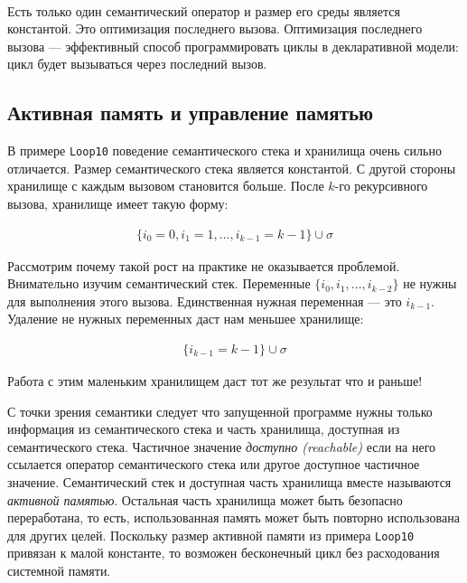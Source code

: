 \begin{eqnarray*}
  [(\text{\lstinline|$\{$Loop10 I+1$\}$|}, \{I \to i_{k-1}\})]
\end{eqnarray*}

Есть только один семантический оператор и размер его среды является константой. Это оптимизация последнего вызова. Оптимизация последнего вызова --- эффективный способ программировать циклы в декларативной модели: цикл будет вызываться через последний вызов.

\subsection{Активная память и управление памятью}

В примере \lstinline|Loop10| поведение семантического стека и хранилища очень сильно отличается. Размер семантического стека является константой. С другой стороны хранилище с каждым вызовом становится больше. После $k$-го рекурсивного вызова, хранилище имеет такую форму:

\begin{eqnarray*}
  \{i_0 = 0, i_1 = 1, ..., i_{k-1} = k - 1\} \cup \sigma
\end{eqnarray*}

Рассмотрим почему такой рост на практике не оказывается проблемой. Внимательно изучим семантический стек. Переменные $\{i_0, i_1, ..., i_{k-2}\}$  не нужны для выполнения этого вызова. Единственная нужная переменная --- это $i_{k-1}$. Удаление не нужных переменных даст нам меньшее хранилище:

\begin{eqnarray*}
  \{i_{k-1} = k - 1\} \cup \sigma
\end{eqnarray*}

Работа с этим маленьким хранилищем даст тот же результат что и раньше!

С точки зрения семантики следует что запущенной программе нужны только информация из семантического стека и часть хранилища, доступная из семантического стека. Частичное значение \emph{доступно (reachable)} если на него ссылается оператор семантического стека или другое доступное частичное значение. Семантический стек и доступная часть хранилища вместе называются \emph{активной памятью}. Остальная часть хранилища может быть безопасно переработана, то есть, использованная память может быть повторно использована для других целей. Поскольку размер активной памяти из примера \lstinline|Loop10| привязан к малой константе, то возможен бесконечный цикл без расходования системной памяти.

